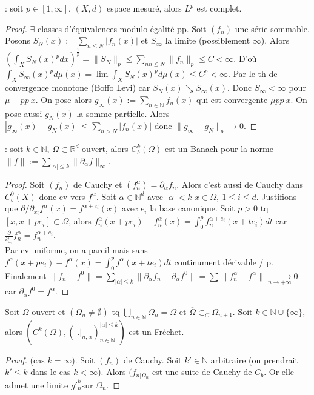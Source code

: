 \begin{ex}[Espaces $L^p$] : soit $p \in [1,\infty ]$, $(X,d)$ espace mesuré, alors $L^p$ est complet.
\end{ex}
\begin{proof}
    $\exists $ classes d'équivalences modulo égalité pp. Soit $(f_n)$ une série sommable. Posons $S_N(x):=\sum\limits_{n\le N}^{} |f_n(x)|$ et $S_\infty $ la limite (possiblement $\infty $). Alors $\left( \int_XS_N(x)^pdx \right) ^{\frac{1}{p}}=\|S_N\|_p\le \sum\limits_{nn\le N}^{} \|f_n\|_p\le C<\infty$. D'où $\int_XS_\infty (x)^pd\mu(x)=\lim\limits_{} \int_XS_N(x)^pd\mu(x)\le C^p<\infty $. Par le th de convergence monotone (Boffo Levi) car $S_N(x)\searrow S_\infty(x)$. Donc $S_\infty <\infty $ pour $\mu- pp\ x$. On pose alors $g_\infty (x):=\sum\limits_{n\in \mathbb{N} }^{} f_n(x)$ qui est convergente $\mu pp\ x$. On pose aussi $g_N(x)$ la somme partielle. Alors $|g_\infty(x) -g_N(x)|\le \sum\limits_{n>N}^{} |f_n(x)|$ donc $\|g_\infty -g_N\|_p\to 0$.
\end{proof}

\begin{ex} : soit $k\in \mathbb{N} $, $\Omega\subset \mathbb{R} ^d$ ouvert, alors $C^k_b(\Omega)$ est un Banach pour la norme $\|f\|:=\sum\limits_{|\alpha |\le k}^{} \|\partial_{\alpha }f\|_\infty $.
\end{ex}
\begin{proof}
    Soit $(f_n)$ de Cauchy et $(f_n^\alpha)=\partial_\alpha f_n$. Alors c'est aussi de Cauchy dans $C^0_b(X)$ donc cv vers $f^\alpha $. Soit $\alpha \in \mathbb{N} ^d$ avec $|\alpha |< k$ $x\in \Omega,\ 1\le i\le d$. Justifions que $\partial/\partial_{x_i}f^\alpha (x)=f^{\alpha+e_i}(x) $ avec $e_i$ la base canonique. Soit $p>0$ tq $[x,x+pe_i]\subset \Omega$, alors $f^\alpha _n(x+pe_i)-f^\alpha _n(x)=\int_0^pf_n^{\alpha +e_i}(x+te_i)dt$ car $\frac{\partial}{\partial_{x_i}}f_n^\alpha =f_n^{\alpha +e_i}$.\\
    Par cv uniforme, on a pareil mais sans \\
    $f^\alpha(x+pe_i)-f^\alpha(x)=\int_0^pf^{\alpha}(x+te_i)dt$ continument dérivable / p.\\
    Finalement $\|f_n-f^0\|=\sum\limits_{|\alpha |\le k}^{} \|\partial_\alpha f_n-\partial_\alpha f^0\|=\sum\limits_{}^{} \|f_n^\alpha -f^\alpha \| \xrightarrow[n\to +\infty]{} 0$ car $\partial _\alpha f^0=f^\alpha $.
\end{proof}

\begin{ex}
    Soit $\Omega$ ouvert et $(\Omega_n\neq \emptyset )$ tq $\bigcup\limits_{n\in \mathbb{N} } \Omega_n=\Omega$ et $\overline{\Omega}\subset _C\Omega_{n+1}$. Soit $k\in \mathbb{N} \cup \{\infty \} $, alors $\left( C^k(\Omega),(|.|_{n,\alpha })_{n\in \mathbb{N} }^{|\alpha |\le k} \right) $ est un Fréchet.
\end{ex}
\begin{proof}
    (cas $k=\infty $). Soit $(f_n)$ de Cauchy. Soit $k'\in \mathbb{N} $ arbitraire (on prendrait $k'\le k$ dans le cas $k<\infty $). Alors $(f_{n|\Omega_n}$ est une suite de Cauchy de $C_b$. Or elle admet une limite $g'^k_n$sur $\Omega_n$.
\end{proof}


